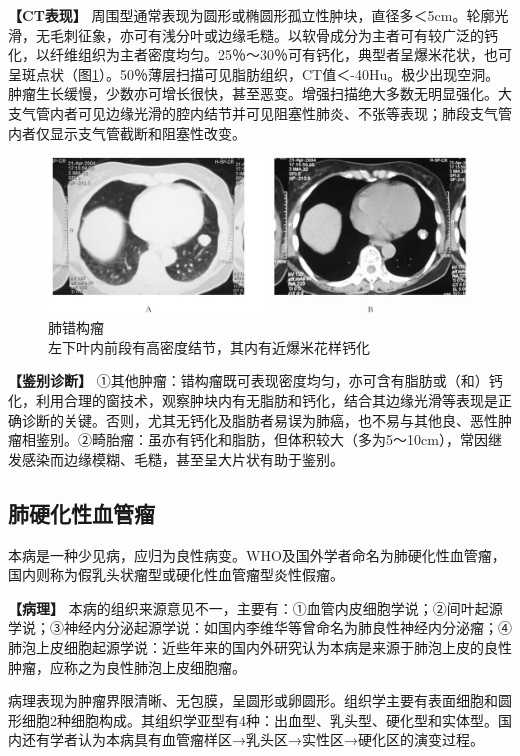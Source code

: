 \textbf{【CT表现】}
周围型通常表现为圆形或椭圆形孤立性肿块，直径多＜5cm。轮廓光滑，无毛刺征象，亦可有浅分叶或边缘毛糙。以软骨成分为主者可有较广泛的钙化，以纤维组织为主者密度均匀。25％～30％可有钙化，典型者呈爆米花状，也可呈斑点状（图\ref{fig9-27}）。50％薄层扫描可见脂肪组织，CT值＜-40Hu。极少出现空洞。肿瘤生长缓慢，少数亦可增长很快，甚至恶变。增强扫描绝大多数无明显强化。大支气管内者可见边缘光滑的腔内结节并可见阻塞性肺炎、不张等表现；肺段支气管内者仅显示支气管截断和阻塞性改变。

\begin{figure}[!htbp]
 \centering
 \includegraphics[width=.7\textwidth,height=\textheight,keepaspectratio]{./images/Image00215.jpg}
 \captionsetup{justification=centering}
 \caption{肺错构瘤\\{\small 左下叶内前段有高密度结节，其内有近爆米花样钙化}}
 \label{fig9-27}
  \end{figure} 

\textbf{【鉴别诊断】}
①其他肿瘤：错构瘤既可表现密度均匀，亦可含有脂肪或（和）钙化，利用合理的窗技术，观察肿块内有无脂肪和钙化，结合其边缘光滑等表现是正确诊断的关键。否则，尤其无钙化及脂肪者易误为肺癌，也不易与其他良、恶性肿瘤相鉴别。②畸胎瘤：虽亦有钙化和脂肪，但体积较大（多为5～10cm），常因继发感染而边缘模糊、毛糙，甚至呈大片状有助于鉴别。

\subsection{肺硬化性血管瘤}

本病是一种少见病，应归为良性病变。WHO及国外学者命名为肺硬化性血管瘤，国内则称为假乳头状瘤型或硬化性血管瘤型炎性假瘤。

\textbf{【病理】}
本病的组织来源意见不一，主要有：①血管内皮细胞学说；②间叶起源学说；③神经内分泌起源学说：如国内李维华等曾命名为肺良性神经内分泌瘤；④肺泡上皮细胞起源学说：近些年来的国内外研究认为本病是来源于肺泡上皮的良性肿瘤，应称之为良性肺泡上皮细胞瘤。

病理表现为肿瘤界限清晰、无包膜，呈圆形或卵圆形。组织学主要有表面细胞和圆形细胞2种细胞构成。其组织学亚型有4种：出血型、乳头型、硬化型和实体型。国内还有学者认为本病具有血管瘤样区→乳头区→实性区→硬化区的演变过程。

